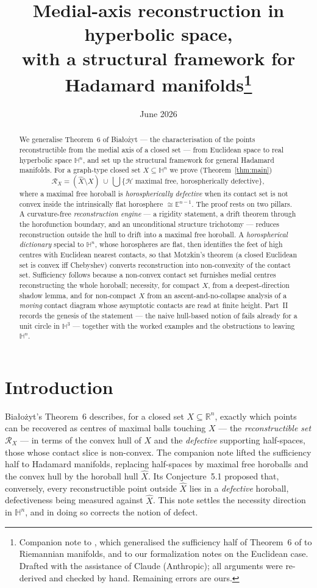 \documentclass[11pt]{article}
\title{Medial-axis reconstruction in hyperbolic space,\\ with a
structural framework for Hadamard manifolds\thanks{Companion note to
\cite{R1}, which generalised the sufficiency half of Theorem~6 of
\cite{Bia} to Riemannian manifolds, and to our formalization notes
\cite{Notes} on the Euclidean case. Drafted with the assistance of
Claude (Anthropic); all arguments were re-derived and checked by hand.
Remaining errors are ours.}}
\author{}
\date{June 2026}
\theoremstyle{remark}
\newcommand{\R}{\mathbb{R}}
\newcommand{\X}{X}
\newcommand{\Xhat}{\widehat{\X}}
\newcommand{\Rx}{\mathcal{R}_{\X}}
\newcommand{\Hb}[1]{\mathcal{H}_{#1}}
\begin{document}
\maketitle

\begin{abstract}
We generalise Theorem~6 of Bia\l{}o\.zyt \cite{Bia} --- the
characterisation of the points reconstructible from the medial axis of a
closed set --- from Euclidean space to real hyperbolic space
$\mathbb{H}^{n}$, and set up the structural framework for general
Hadamard manifolds. For a graph-type closed set
$\X\subseteq\mathbb{H}^{n}$ we prove (Theorem~\ref{thm:main})
\[
  \Rx=(\Xhat\setminus\X)\ \cup\
  \bigcup\bigl\{\Hb{}\ \text{maximal free, horospherically defective}\bigr\},
\]
where a maximal free horoball is \emph{horospherically defective} when
its contact set is not convex inside the intrinsically flat horosphere
$\cong\mathbb{E}^{n-1}$. The proof rests on two pillars. A curvature-free
\emph{reconstruction engine} --- a rigidity statement, a drift theorem
through the horofunction boundary, and an unconditional structure
trichotomy --- reduces reconstruction outside the hull to drift into a
maximal free horoball. A \emph{horospherical dictionary} special to
$\mathbb{H}^{n}$, whose horospheres are flat, then identifies the feet of
high centres with Euclidean nearest contacts, so that Motzkin's theorem
(a closed Euclidean set is convex iff Chebyshev) converts reconstruction
into non-convexity of the contact set. Sufficiency follows because a
non-convex contact set furnishes medial centres reconstructing the whole
horoball; necessity, for compact $\X$, from a deepest-direction shadow
lemma, and for non-compact $\X$ from an ascent-and-no-collapse analysis
of a \emph{moving} contact diagram whose asymptotic contacts are read at
finite height. Part~II records the genesis of the statement --- the
naive hull-based notion of \cite{R1} fails already for a unit circle in
$\mathbb{H}^{3}$ --- together with the worked examples and the
obstructions to leaving $\mathbb{H}^{n}$.
\end{abstract}

\section{Introduction}\label{sec:intro}

Bia\l{}o\.zyt's Theorem~6 \cite{Bia} describes, for a closed set
$\X\subseteq\R^{n}$, exactly which points can be recovered as centres of
maximal balls touching $\X$ --- the \emph{reconstructible set} $\Rx$ ---
in terms of the convex hull of $\X$ and the \emph{defective} supporting
half-spaces, those whose contact slice is non-convex. The companion note
\cite{R1} lifted the sufficiency half to Hadamard manifolds, replacing
half-spaces by maximal free horoballs and the convex hull by the horoball
hull $\Xhat$. Its Conjecture~5.1 proposed that, conversely, every
reconstructible point outside $\Xhat$ lies in a \emph{defective} horoball,
defectiveness being measured against $\Xhat$. This note settles the
necessity direction in $\mathbb{H}^{n}$, and in doing so corrects the
notion of defect.
\end{document}
